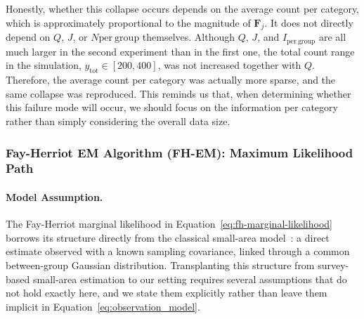 Honestly, whether this collapse occurs depends on the average count per category, which is approximately proportional to the magnitude of $\mathbf{F}_{j}$. It does not directly depend on $Q$, $J$, or $N{\mathrm{per\ group}}$ themselves. Although $Q$, $J$, and $I_{\mathrm{per\ group}}$ are all much larger in the second experiment than in the first one, the total count range in the simulation, $y_{\mathrm{tot}}\in[200,400]$, was not increased together with $Q$. Therefore, the average count per category was actually more sparse, and the same collapse was reproduced. This reminds us that, when determining whether this failure mode will occur, we should focus on the information per category rather than simply considering the overall data size.

\subsubsection{Fay-Herriot EM Algorithm (FH-EM): Maximum Likelihood Path}

\paragraph*{Model Assumption.} The Fay-Herriot marginal likelihood in Equation~\eqref{eq:fh-marginal-likelihood} borrows its structure directly from the classical small-area model~\citep{Herriot1979, Pfeffermann2011}: a direct estimate observed with a known sampling covariance, linked through a common between-group Gaussian distribution. Transplanting this structure from survey-based small-area estimation to our setting requires several assumptions that do not hold exactly here, and we state them explicitly rather than leave them implicit in Equation~\eqref{eq:observation_model}.

